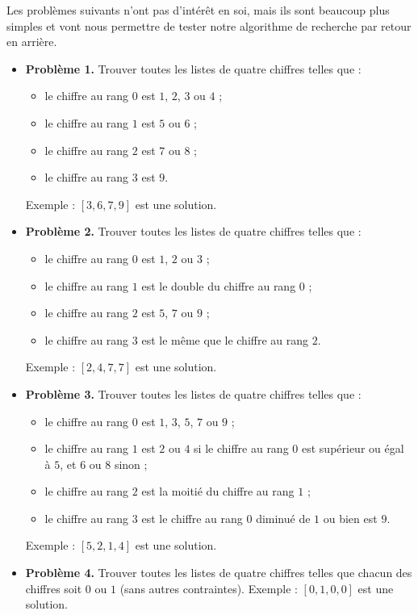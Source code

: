 \documentclass[11pt,class=report,crop=false]{standalone}
\begin{document}
\begin{cours}

Les problèmes suivants n'ont pas d'intérêt en soi, mais ils sont beaucoup plus simples et vont nous permettre de tester notre algorithme de recherche par retour en arrière.


\begin{itemize}
  \item \textbf{Problème 1.} 
  Trouver toutes les listes de quatre chiffres telles que :
  \begin{itemize} 
    \item le chiffre au rang $0$ est $1$, $2$, $3$ ou $4$ ;
    \item le chiffre au rang $1$ est $5$ ou $6$ ;
    \item le chiffre au rang $2$ est $7$ ou $8$ ;
    \item le chiffre au rang $3$ est $9$.
  \end{itemize}
  
  Exemple : $[3,6,7,9]$ est une solution.
  
  \item \textbf{Problème 2.} 
  Trouver toutes les listes de quatre chiffres telles que :
  \begin{itemize} 
    \item le chiffre au rang $0$ est $1$, $2$ ou $3$ ;
    \item le chiffre au rang $1$ est le double du chiffre au rang $0$ ;
    \item le chiffre au rang $2$ est $5$, $7$ ou $9$ ;
    \item le chiffre au rang $3$ est le même que le chiffre au rang $2$.
  \end{itemize}
  
  Exemple : $[2,4,7,7]$ est une solution.
  
  
  \item \textbf{Problème 3.} 
 Trouver toutes les listes de quatre chiffres telles que :
  \begin{itemize} 
    \item le chiffre au rang $0$ est $1$, $3$, $5$, $7$ ou $9$ ;
    \item le chiffre au rang $1$ est $2$ ou $4$ si le chiffre au rang $0$ est supérieur ou égal à $5$, et $6$ ou $8$ sinon ;
    \item le chiffre au rang $2$ est la moitié du chiffre au rang $1$ ;
    \item le chiffre au rang $3$ est le chiffre au rang $0$ diminué de $1$ ou bien est $9$.
  \end{itemize}
  
  Exemple : $[5,2,1,4]$ est une solution. 
  
  \item \textbf{Problème 4.}    
  Trouver toutes les listes de quatre chiffres telles que chacun des chiffres soit $0$ ou $1$ (sans autres contraintes).
  Exemple : $[0,1,0,0]$ est une solution.
   \end{itemize} 
\end{cours}
\end{document}
